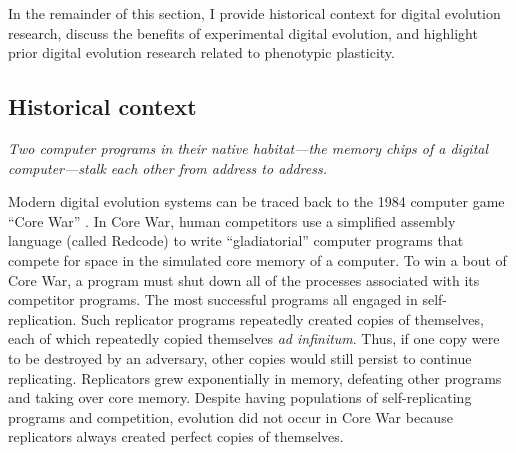 In the remainder of this section, I provide historical context for digital evolution research, discuss the benefits of experimental digital evolution, and highlight prior digital evolution research related to phenotypic plasticity.


\subsection{Historical context}

\begin{displayquote}

\textit{Two computer programs in their native habitat---the memory chips of a digital computer---stalk each other from address to address.}  \citep{dewdney_core_wars_1984}

\end{displayquote}

Modern digital evolution systems can be traced back to the 1984 computer game ``Core War'' \citep{dewdney_core_wars_1984}.
In Core War, human competitors use a simplified assembly language (called Redcode) to write ``gladiatorial'' computer programs that compete for space in the simulated core memory of a computer.
To win a bout of Core War, a program must shut down all of the processes associated with its competitor programs.
The most successful programs all engaged in self-replication.
Such replicator programs repeatedly created copies of themselves, each of which repeatedly copied themselves \textit{ad infinitum}. 
Thus, if one copy were to be destroyed by an adversary, other copies would still persist to continue replicating. 
Replicators grew exponentially in memory, defeating other programs and taking over core memory.
Despite having populations of self-replicating programs and competition, evolution did not occur in Core War because replicators always created perfect copies of themselves.


